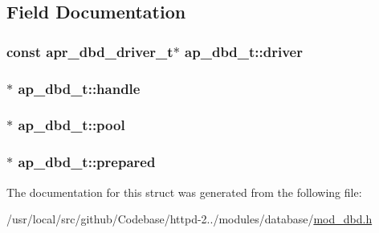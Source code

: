 \subsection{Field Documentation}
\subsubsection[{\texorpdfstring{driver}{driver}}]{\setlength{\rightskip}{0pt plus 5cm}const {\bf apr\+\_\+dbd\+\_\+driver\+\_\+t}$\ast$ ap\+\_\+dbd\+\_\+t\+::driver}\hypertarget{structap__dbd__t_aae4c35411195f3a7700b0e0414c689ee}{}\label{structap__dbd__t_aae4c35411195f3a7700b0e0414c689ee}
\subsubsection[{\texorpdfstring{handle}{handle}}]{$\ast$ ap\+\_\+dbd\+\_\+t\+::handle}\hypertarget{structap__dbd__t_af825005efce580e86b16ae2031b5218a}{}\label{structap__dbd__t_af825005efce580e86b16ae2031b5218a}
\subsubsection[{\texorpdfstring{pool}{pool}}]{$\ast$ ap\+\_\+dbd\+\_\+t\+::pool}\hypertarget{structap__dbd__t_a851280460a614980589795f12140d7f5}{}\label{structap__dbd__t_a851280460a614980589795f12140d7f5}
\subsubsection[{\texorpdfstring{prepared}{prepared}}]{$\ast$ ap\+\_\+dbd\+\_\+t\+::prepared}\hypertarget{structap__dbd__t_ad8f9283ad51cb317aabd04784498cb92}{}\label{structap__dbd__t_ad8f9283ad51cb317aabd04784498cb92}


The documentation for this struct was generated from the following file\+:\begin{DoxyCompactItemize}
\item 
/usr/local/src/github/\+Codebase/httpd-\/2../modules/database/\hyperlink{mod__dbd_8h}{mod\+\_\+dbd.\+h}\end{DoxyCompactItemize}

